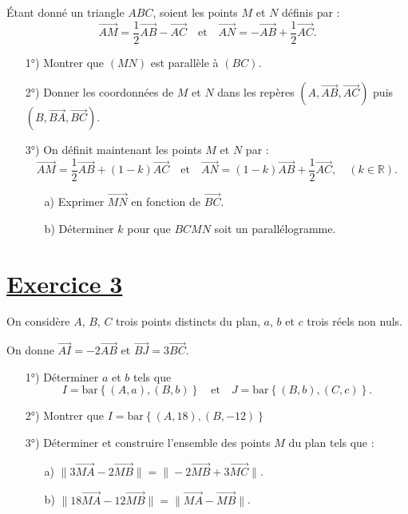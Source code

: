 \documentclass[12pt]{article}
\begin{document}
Étant donné un triangle \( ABC \), soient les points \( M \) et \( N \) définis par :
\[
\overrightarrow{AM} = \frac{1}{2} \overrightarrow{AB} - \overrightarrow{AC} \quad \text{et} \quad \overrightarrow{AN} = -\overrightarrow{AB} + \frac{1}{2} \overrightarrow{AC}.
\]

\begin{enumerate}
    \item[1°)] Montrer que \( (MN) \) est parallèle à \( (BC) \).
    \item[2°)] Donner les coordonnées de \( M \) et \( N \) dans les repères \( (A, \overrightarrow{AB}, \overrightarrow{AC}) \) puis \( (B, \overrightarrow{BA}, \overrightarrow{BC}) \).
    \item[3°)] On définit maintenant les points \( M \) et \( N \) par :
    \[
    \overrightarrow{AM} = \frac{1}{2} \overrightarrow{AB} + (1 - k) \overrightarrow{AC} \quad \text{et} \quad \overrightarrow{AN} = (1 - k) \overrightarrow{AB} + \frac{1}{2} \overrightarrow{AC}, \quad (k \in \mathbb{R}).
    \]
    \begin{enumerate}
        \item[a)] Exprimer \( \overrightarrow{MN} \) en fonction de \( \overrightarrow{BC} \).
        \item[b)] Déterminer \( k \) pour que \( BCMN \) soit un parallélogramme.
    \end{enumerate}
\end{enumerate}

\section*{\underline{Exercice 3}}

On considère \( A \), \( B \), \( C \) trois points distincts du plan, \( a \), \( b \) et \( c \) trois réels non nuls. 

On donne \( \overrightarrow{AI} = -2 \overrightarrow{AB} \) et \( \overrightarrow{BJ} = 3 \overrightarrow{BC} \).

\begin{enumerate}
    \item[1°)] Déterminer \( a \) et \( b \) tels que 
    \[
    I = \text{bar}\left\lbrace  \left( A, a \right), \left( B, b \right) \right\rbrace  \quad \text{et} \quad J = \text{bar}\left\lbrace  \left( B, b \right), \left( C, c \right) \right\rbrace .
    \]
    
    \item[2°)] Montrer que \( I = \text{bar}\left\lbrace \left( A, 18 \right), \left( B, -12 \right) \right\rbrace \) 
    
    \item[3°)] Déterminer et construire l'ensemble des points \( M \) du plan tels que :
    \begin{enumerate}
        \item[a)] \( \| 3 \overrightarrow{MA} - 2 \overrightarrow{MB} \| = \| - 2 \overrightarrow{MB} + 3 \overrightarrow{MC} \| \).
        \item[b)] \( \| 18 \overrightarrow{MA} - 12 \overrightarrow{MB} \| = \| \overrightarrow{MA} -  \overrightarrow{MB} \| \).
    \end{enumerate}
\end{enumerate}
\end{document}
